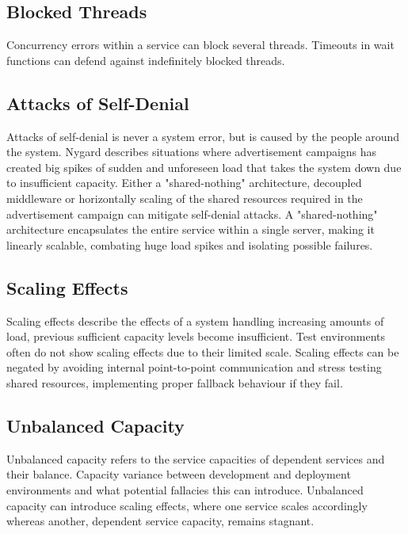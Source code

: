 \subsection{Blocked Threads}
Concurrency errors within a service can block several threads. Timeouts in wait functions can defend against indefinitely blocked threads.

\subsection{Attacks of Self-Denial}
Attacks of self-denial is never a system error, but is caused by the people around the system. Nygard describes situations where advertisement campaigns has created big spikes of sudden and unforeseen load that takes the system down due to insufficient capacity. 
Either a "shared-nothing" architecture, decoupled middleware or horizontally scaling of the shared resources required in the advertisement campaign can mitigate self-denial attacks. A "shared-nothing" architecture encapsulates the entire service within a single server, making it linearly scalable, combating huge load spikes and isolating possible failures.

\subsection{Scaling Effects}
Scaling effects describe the effects of a system handling increasing amounts of load, previous sufficient capacity levels become insufficient. Test environments often do not show scaling effects due to their limited scale.
Scaling effects can be negated by avoiding internal point-to-point communication and stress testing shared resources, implementing proper fallback behaviour if they fail.

\subsection{Unbalanced Capacity}
Unbalanced capacity refers to the service capacities of dependent services and their balance. Capacity variance between development and deployment environments and what potential fallacies this can introduce. Unbalanced capacity can introduce scaling effects, where one service scales accordingly whereas another, dependent service capacity, remains stagnant.

